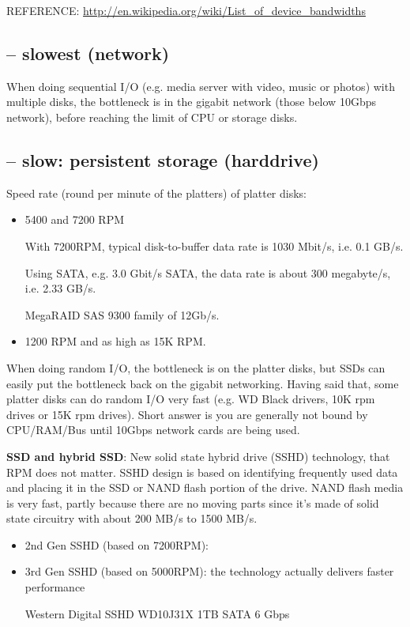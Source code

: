   REFERENCE:
  \url{http://en.wikipedia.org/wiki/List_of_device_bandwidths}
 
\subsection{-- slowest (network)}


When doing sequential I/O (e.g. media server with video, music or photos) with
multiple disks, the bottleneck is in the gigabit network (those below 10Gbps
network), before reaching the limit of CPU or storage disks.


\subsection{-- slow: persistent storage (harddrive)}

Speed rate (round per minute of the platters) of platter disks:
\begin{itemize}
  \item 5400 and 7200 RPM
  
  With 7200RPM, typical disk-to-buffer data rate is 1030 Mbit/s, i.e. 0.1 GB/s.
  
  Using SATA, e.g. 3.0 Gbit/s SATA, the data rate is about 300 megabyte/s, i.e.
  2.33 GB/s.

  MegaRAID SAS 9300 family of 12Gb/s. 
  
  \item 1200 RPM and as high as 15K RPM.
\end{itemize}

When doing random I/O, the bottleneck is on the platter disks, but SSDs can
easily put the bottleneck back on the gigabit networking. Having said that, some
platter disks can do random I/O very fast (e.g. WD Black drivers, 10K rpm drives
or 15K rpm drives). Short answer is you are generally not bound by CPU/RAM/Bus
until 10Gbps network cards are being used.

{\bf SSD and hybrid SSD}: New solid state hybrid drive (SSHD) technology, that
RPM does not matter. SSHD design is based on identifying frequently used data
and placing it in the SSD or NAND flash portion of the drive.
NAND flash media is very fast, partly because there are no moving parts since
it's made of solid state circuitry with   about 200 MB/s to 1500 MB/s.
\begin{itemize}
  \item 2nd Gen SSHD (based on 7200RPM):
  
  
  \item 3rd Gen SSHD (based on 5000RPM): the technology actually delivers faster
  performance
  
  Western Digital SSHD WD10J31X 1TB SATA 6 Gbps 
\end{itemize}

